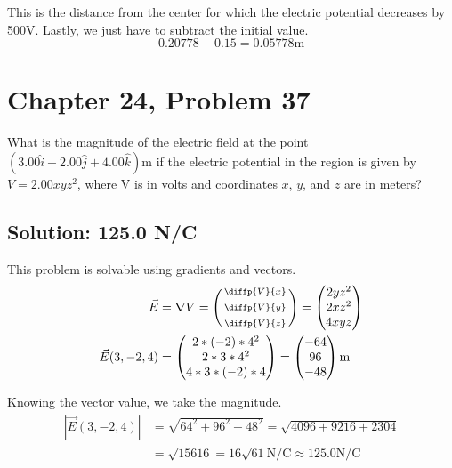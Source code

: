 \documentclass[12pt]{article}
\begin{document}
This is the distance from the center for which the electric potential decreases by 500V.
Lastly, we just have to subtract the initial value.
\begin{equation*}
    0.20778 - 0.15 = \boxed{0.05778 \unit{\meter}}
\end{equation*}

\pagebreak
\section{Chapter 24, Problem 37}
What is the magnitude of the electric field at the point $(3.00\hat{i} - 2.00\hat{j} + 4.00\hat{k}) \unit{\meter}$ if the electric potential in the region is given by $V = 2.00xyz^2$, where V is in volts and coordinates $x$, $y$, and $z$ are in meters?

\subsection*{Solution: 125.0 N/C}
This problem is solvable using gradients and vectors.
\begin{align*}
    \vec{E} &=  \nabla V
        =   \left(\begin{smallmatrix} \diffp{V}{x}\\ \\ \diffp{V}{y}\\ \\ \diffp{V}{z} \end{smallmatrix}\right)
        =   \begin{pmatrix} 2yz^2\\ 2xz^2\\ 4xyz \end{pmatrix}\\
    \vec{E}(3, -2, 4)   &=  \begin{pmatrix} 2*(-2)*4^2\\ 2*3*4^2\\ 4*3*(-2)*4 \end{pmatrix}
        =   \begin{pmatrix} -64 \\ 96 \\ -48 \end{pmatrix} \unit{\meter}
\end{align*}

Knowing the vector value, we take the magnitude.
\begin{align*}
    \left|\vec{E}(3, -2, 4)\right|  &=  \sqrt{64^2 + 96^2 - 48^2}
        =   \sqrt{4096 + 9216 + 2304}\\
        &=  \sqrt{15616}
        =   \boxed{16 \sqrt{61} \unit{\newton/\coulomb} \approx 125.0 \unit{\newton/\coulomb}}
\end{align*}
\end{document}
